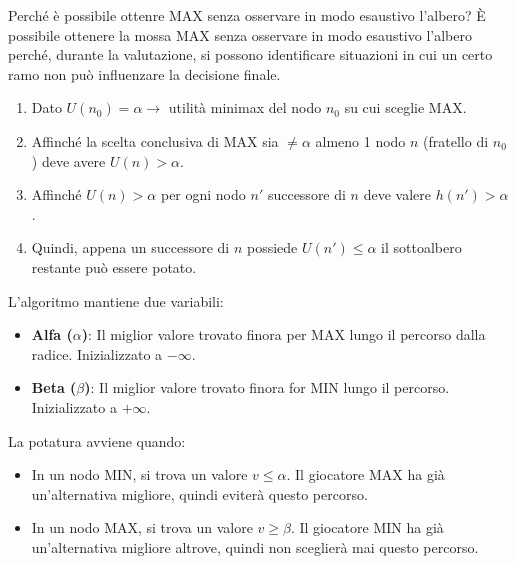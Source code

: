 \begin{nota}{Perché è possibile ottenre MAX senza osservare in modo esaustivo l'albero?}{}
    È possibile ottenere la mossa MAX senza osservare in modo esaustivo l'albero
    perché, durante la valutazione, si possono identificare situazioni in cui
    un certo ramo non può influenzare la decisione finale.
    \begin{enumerate}
        \item Dato $U(n_0) = \alpha \to$ utilità minimax del nodo $n_0$ su cui
        sceglie MAX.
        \item Affinché la scelta conclusiva di MAX sia $\ne \alpha$ almeno 1
        nodo $n$ (fratello di $n_0$) deve avere $U(n) > \alpha$.
        \item Affinché $U(n) > \alpha$ per ogni nodo $n'$ successore di $n$
        deve valere $h(n') > \alpha$.
        \item Quindi, appena un successore di $n$ possiede $U(n') \le \alpha$
        il sottoalbero restante può essere potato.
    \end{enumerate}
    
\end{nota}

L'algoritmo mantiene due variabili:
\begin{itemize}
    \item \textbf{Alfa ($\alpha$)}: Il miglior valore trovato finora
    per MAX lungo il percorso dalla radice.
    Inizializzato a $-\infty$.
    \item \textbf{Beta ($\beta$)}: Il miglior valore trovato finora for
    MIN lungo il percorso.
    Inizializzato a $+\infty$.
\end{itemize}

La potatura avviene quando:
\begin{itemize}
    \item In un nodo MIN, si trova un valore $v \le \alpha$.
    Il giocatore MAX ha già un'alternativa migliore, quindi eviterà
    questo percorso.
    \item In un nodo MAX, si trova un valore $v \ge \beta$.
    Il giocatore MIN ha già un'alternativa migliore altrove, quindi
    non sceglierà mai questo percorso.
\end{itemize}

